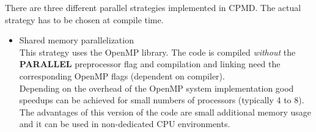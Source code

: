 \documentclass[twoside,10pt,titlepage,a4paper]{article}
\begin{document}
There are three different parallel strategies implemented in CPMD.
The actual strategy has to be chosen at compile time.
\begin{itemize}
   \item Shared memory parallelization\\[8pt]
         This strategy uses the OpenMP library.
         The code is compiled {\em without} the {\bf PARALLEL}
         preprocessor flag and compilation and linking need the
         corresponding OpenMP flags (dependent on compiler). \\
         Depending on the overhead of the OpenMP system implementation
         good speedups can be achieved for small numbers of
         processors (typically 4 to 8). The advantages of this
         version of the code are small additional memory usage and it
         can be used in non-dedicated CPU environments.


\end{itemize}
\end{document}
